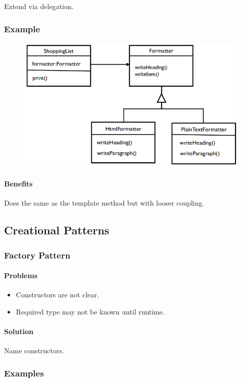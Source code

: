 \documentclass[twocolumn,english]{article}
\begin{document}
Extend via delegation.

\subsubsection*{Example}

\begin{figure}[H]
\centering{}\includegraphics[width=0.6\columnwidth]{img/strategy}
\end{figure}

\paragraph{Benefits}

Does the same as the template method but with looser coupling.

\subsection{Creational Patterns}

\subsubsection{Factory Pattern}

\paragraph{Problems}
\begin{itemize}
\item Constructors are not clear.
\item Required type may not be known until runtime.
\end{itemize}

\paragraph{Solution}

Name constructors.

\subsubsection*{Examples}
\end{document}
